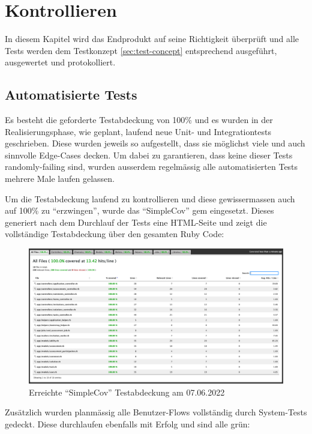 \chapter{Kontrollieren} \label{ch:check}

In diesem Kapitel wird das Endprodukt auf seine Richtigkeit überprüft und alle
Tests werden dem Testkonzept \ref{sec:test-concept} entsprechend ausgeführt, ausgewertet und protokolliert.

\section{Automatisierte Tests}

Es besteht die geforderte Testabdeckung von 100\% und es wurden in der Realisierungsphase, wie geplant, laufend neue Unit- und Integrationtests geschrieben.
Diese wurden jeweils so aufgestellt, dass sie möglichst viele und auch sinnvolle Edge-Cases decken. Um dabei zu garantieren, dass keine dieser Tests randomly-failing sind,
wurden ausserdem regelmässig alle automatisierten Tests mehrere Male laufen gelassen.

Um die Testabdeckung laufend zu kontrollieren und diese gewissermassen auch auf 100\% zu \enquote{erzwingen}, wurde das \enquote{SimpleCov} gem eingesetzt.
Dieses generiert nach dem Durchlauf der Tests eine HTML-Seite und zeigt die vollständige Testabdeckung über den gesamten Ruby Code:

\begin{figure}[H]
  \centering
  \includegraphics[width=\textwidth]{images/test-coverage.png}
  \caption{\label{fig:test-coverage}Erreichte \enquote{SimpleCov} Testabdeckung am 07.06.2022}
\end{figure}

Zusätzlich wurden planmässig alle Benutzer-Flows vollständig durch System-Tests gedeckt. Diese durchlaufen ebenfalls mit Erfolg und sind alle grün:


